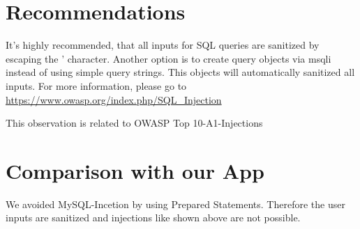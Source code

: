 \section{Recommendations}
It's highly recommended, that all inputs for SQL queries are sanitized by escaping the ' character.
Another option is to create query objects via msqli instead of using simple query strings.
This objects will automatically sanitized all inputs. For more information, please go to \url{https://www.owasp.org/index.php/SQL\_Injection}

This observation is related to OWASP Top 10-A1-Injections

\section{Comparison with our App}
We avoided MySQL-Incetion by using Prepared Statements. Therefore the user inputs are sanitized and injections like shown above are not possible.
